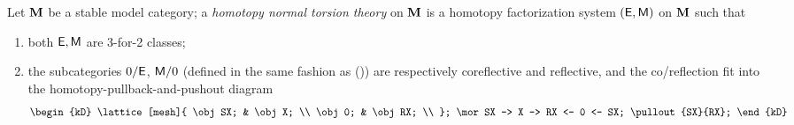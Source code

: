 \begin{definition}
Let $\mathbf{M}$ be a stable model category; a \emph{homotopy normal torsion theory} on $\mathbf{M}$ is a homotopy factorization system $(\mathsf{E},\mathsf{M})$ on $\mathbf{M}$ such that
\begin{enumerate}
\item both $\mathsf{E},\mathsf{M}$ are 3\hyp{}for\hyp{}2 classes;
\item the subcategories $0/\mathsf{E}$, $\mathsf{M}/0$ (defined in the same fashion as ()) are respectively coreflective and reflective, and the co\fshyp{}reflection fit into the homotopy\hyp{}pullback\hyp{}and\hyp{}pushout diagram
\[
\begin{kD}
\lattice[mesh]{
	\obj SX; & \obj X; \\
	\obj 0; & \obj RX; \\
};
\mor SX -> X -> RX <- 0 <- SX;
\pullout{SX}{RX};
\end{kD}
\]
\end{enumerate}
\end{definition}
